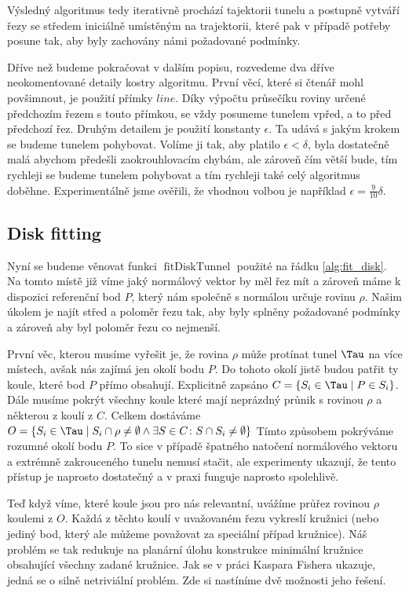 Výsledný algoritmus tedy iterativně prochází tajektorii tunelu a postupně vytváří řezy
se středem iniciálně umístěným na trajektorii, které pak v případě potřeby posune tak,
aby byly zachovány námi požadované podmínky.

Dříve než budeme pokračovat v dalším popisu, rozvedeme dva dříve neokomentované
detaily kostry algoritmu. První věcí, které si čtenář mohl povšimnout, je použití přímky
$ line $. Díky výpočtu průsečíku roviny určené předchozím řezem s touto přímkou, se
vždy posuneme tunelem vpřed, a to před předchozí řez. Druhým detailem je použití
konstanty $ \epsilon $. Ta udává s jakým krokem se budeme tunelem pohybovat.
Volíme ji tak, aby platilo  $ \epsilon < \delta $, byla dostatečně malá abychom
předešli zaokrouhlovacím chybám, ale zároveň čím větší bude, tím rychleji se
budeme tunelem pohybovat a tím rychleji také celý algoritmus doběhne. Experimentálně
jsme ověřili, že vhodnou volbou je například $ \epsilon = \frac{9}{10} \delta $.


\subsection{Disk fitting}
Nyní se budeme věnovat funkci $ \operatorname{fitDiskTunnel} $ použité na řádku
\ref{alg:fit_disk}. Na tomto místě již víme jaký normálový vektor by měl řez mít a
zároveň máme k dispozici referenční bod $ P $, který nám společně s normálou
určuje rovinu $ \rho $. Našim úkolem je najít střed a poloměr řezu tak, aby
byly splněny požadované podmínky a zároveň aby byl poloměr řezu co nejmenší.

První věc, kterou musíme vyřešit je, že rovina $ \rho $ může protínat tunel $ \Tau $
na více místech, avšak nás zajímá jen okolí bodu $ P $. Do tohoto okolí jistě
budou patřit ty koule, které bod $ P $ přímo obsahují. Explicitně
zapsáno $ C = \{S_i \in \Tau \mid P \in S_i \} $. Dále musíme pokrýt všechny
koule které mají neprázdný průnik s rovinou $ \rho $ a některou z koulí z $ C $.
Celkem dostáváme
$ O = \{ S_i \in \Tau \mid S_i \cap \rho \neq \emptyset \wedge \exists S \in C \colon S \cap S_i \neq \emptyset  \}$
Tímto způsobem pokrýváme rozumné okolí bodu $ P $. To sice v případě špatného
natočení normálového vektoru a extrémně zakrouceného tunelu nemusí stačit, ale
experimenty ukazují, že tento přístup je naprosto dostatečný a v praxi funguje
naprosto spolehlivě.

Teď když víme, které koule jsou pro nás relevantní, uvážíme průřez rovinou
$ \rho $ koulemi z $ O $. Každá z těchto koulí v uvažovaném řezu vykreslí
kružnici (nebo jediný bod, který ale můžeme považovat za speciální případ kružnice).
Náš problém se tak redukuje na planární úlohu konstrukce minimální kružnice obsahující
všechny zadané kružnice. Jak se v práci Kaspara Fishera \cite{FisherBalls} ukazuje,
jedná se o silně netriviální problém. Zde si nastíníme dvě možnosti jeho řešení.

